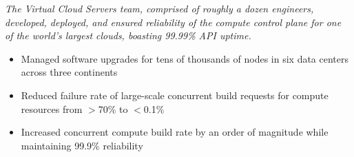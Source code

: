 \documentclass[margin,line]{resume}
\begin{document}
\begin{resume}
{\small\textit{The Virtual Cloud Servers team, comprised of roughly a dozen engineers, developed, deployed, and
ensured reliability of the compute control plane for one of the world's largest clouds, boasting 99.99\% API uptime.}}
\begin{itemize} \itemsep -2pt %
\small\item Managed software upgrades for tens of thousands of nodes in six data centers across three continents
\small\item Reduced failure rate of large-scale concurrent build requests for compute resources from $>$70\% to $<$0.1\%
\small\item Increased concurrent compute build rate by an order of magnitude while maintaining 99.9\% reliability
\end{itemize}


\end{resume}
\end{document}
